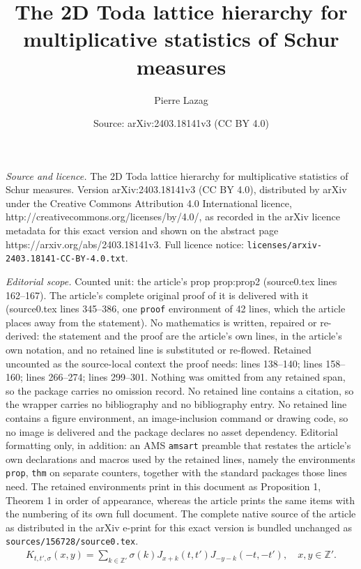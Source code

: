 \documentclass[10pt,a4paper]{amsart}
\title{The 2D Toda lattice hierarchy for multiplicative statistics of Schur measures}
\author{Pierre Lazag}
\date{Source: arXiv:2403.18141v3 (CC BY 4.0)}
\newcommand{\Z}{\mathbb{Z}}
\begin{document}
\maketitle

\noindent\emph{Source and licence.} The 2D Toda lattice hierarchy for multiplicative statistics of Schur measures. Version arXiv:2403.18141v3 (CC BY 4.0), distributed by arXiv under the Creative Commons Attribution 4.0 International licence, http://creativecommons.org/licenses/by/4.0/, as recorded in the arXiv licence metadata for this exact version and shown on the abstract page https://arxiv.org/abs/2403.18141v3. Full licence notice: \texttt{licenses/arxiv-2403.18141-CC-BY-4.0.txt}.\par\smallskip

\noindent\textit{Editorial scope.} Counted unit: the article's prop prop:prop2 (source0.tex lines 162--167). The article's complete original proof of it is delivered with it (source0.tex lines 345--386, one \texttt{proof} environment of 42 lines, which the article places away from the statement). No mathematics is written, repaired or re-derived: the statement and the proof are the article's own lines, in the article's own notation, and no retained line is substituted or re-flowed.  Retained uncounted as the source-local context the proof needs: lines 138--140; lines 158--160; lines 266--274; lines 299--301.  Nothing was omitted from any retained span, so the package carries no omission record.  No retained line contains a citation, so the wrapper carries no bibliography and no bibliography entry.  No retained line contains a figure environment, an image-inclusion command or drawing code, so no image is delivered and the package declares no asset dependency.  Editorial formatting only, in addition: an AMS \texttt{amsart} preamble that restates the article's own declarations and macros used by the retained lines, namely the environments \texttt{prop}, \texttt{thm} on separate counters, together with the standard packages those lines need.  The retained environments print in this document as Proposition 1, Theorem 1 in order of appearance, whereas the article prints the same items with the numbering of its own full document.  The complete native source of the article as distributed in the arXiv e-print for this exact version is bundled unchanged as \texttt{sources/156728/source0.tex}.
\begin{align} \label{eq:defK}
K_{t,t',\sigma}(x,y) = \sum_{k \in \Z'} \sigma(k) J_{x +k}(t,t') J_{-y-k}(-t,-t'), \quad x,y \in \Z'.
\end{align}
\end{document}
